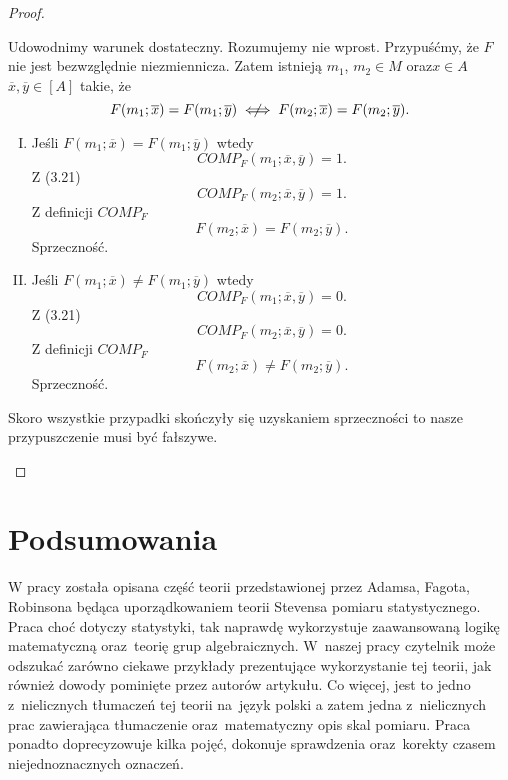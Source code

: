 \documentclass[12pt,a4paper]{report}
\newcommand{\domkniecie}[1]{\left[ {#1} \right] }
\newcommand{\notiff}{%
  \mathrel{{\ooalign{\hidewidth$\not\phantom{"}$\hidewidth\cr$\iff$}}}}
\begin{document}
\begin{proof}
\begin{enumerate}
Udowodnimy warunek dostateczny. Rozumujemy nie wprost. Przypuśćmy, że $F$ nie jest bezwzględnie niezmiennicza. Zatem istnieją $m_1$, $m_2 \in M$ oraz$x\in A$ $\overline{x}, \overline{y} \in \domkniecie{A}$ takie, że
$$
F(m_{1};\overline{x})=F(m_{1};\overline{y}) \notiff F(m_{2};\overline{x})=F(m_{2};\overline{y}).
$$
\begin{enumerate}[I.]
\item
Jeśli $F(m_1;\overline{x})=F(m_1;\overline{y})$ wtedy
$$
COMP_{F}(m_1;\overline{x},\overline{y})=1.
$$
Z (3.21)
$$
COMP_{F}(m_2;\overline{x},\overline{y})=1.
$$
Z definicji $COMP_F$
$$
F(m_2;\overline{x})=F(m_2;\overline{y}).
$$ 
Sprzeczność.
\item
Jeśli $F(m_1;\overline{x})\ne F(m_1;\overline{y})$ wtedy 
$$
COMP_{F}(m_1;\overline{x},\overline{y})=0.
$$
Z (3.21) 
$$
COMP_{F}(m_2;\overline{x},\overline{y})=0.
$$
Z definicji $COMP_F$
$$
F(m_2;\overline{x})\ne F(m_2;\overline{y}).
$$ 
Sprzeczność.
\end{enumerate}
Skoro wszystkie przypadki skończyły się uzyskaniem sprzeczności to nasze przypuszczenie musi być fałszywe.
\end{enumerate}
\end{proof}

\chapter{Podsumowania}

W pracy została opisana część teorii przedstawionej przez Adamsa, Fagota, Robinsona {\citep{adams1965theory}} będąca uporządkowaniem teorii Stevensa pomiaru statystycznego. Praca choć dotyczy statystyki, tak naprawdę wykorzystuje zaawansowaną logikę matematyczną oraz~teorię grup algebraicznych. W~naszej pracy czytelnik może odszukać zarówno ciekawe przykłady prezentujące wykorzystanie tej teorii, jak również dowody pominięte przez autorów artykułu. Co więcej, jest to jedno z~nielicznych tłumaczeń tej teorii na~język polski a zatem jedna z~nielicznych prac zawierająca tłumaczenie oraz~matematyczny opis skal pomiaru. Praca ponadto doprecyzowuje kilka pojęć, dokonuje sprawdzenia oraz~korekty czasem niejednoznacznych oznaczeń. 
\end{document}
